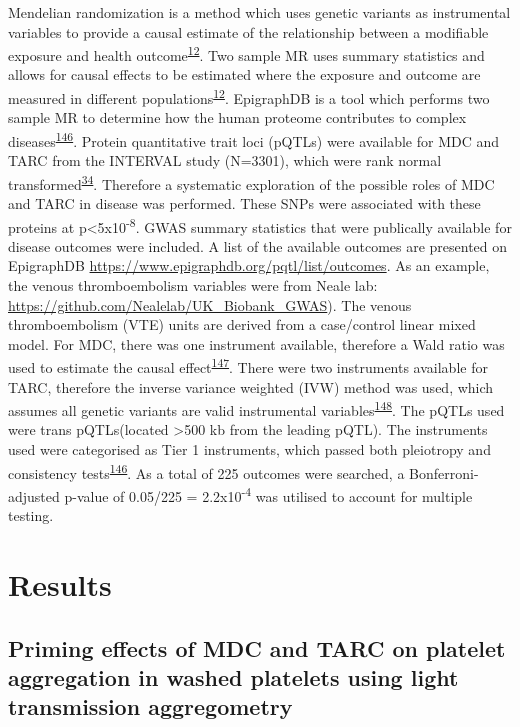 \documentclass[11pt,twoside]{bristolthesis}
\begin{document}
Mendelian randomization is a method which uses genetic variants as instrumental variables to provide a causal estimate of the relationship between a modifiable exposure and health outcome\textsuperscript{\protect\hyperlink{ref-Davies2018}{12}}. Two sample MR uses summary statistics and allows for causal effects to be estimated where the exposure and outcome are measured in different populations\textsuperscript{\protect\hyperlink{ref-Davies2018}{12}}. EpigraphDB is a tool which performs two sample MR to determine how the human proteome contributes to complex diseases\textsuperscript{\protect\hyperlink{ref-Zheng2020}{146}}. Protein quantitative trait loci (pQTLs) were available for MDC and TARC from the INTERVAL study (N=3301), which were rank normal transformed\textsuperscript{\protect\hyperlink{ref-Sun2018}{34}}. Therefore a systematic exploration of the possible roles of MDC and TARC in disease was performed. These SNPs were associated with these proteins at p\textless5x10\textsuperscript{-8}. GWAS summary statistics that were publically available for disease outcomes were included. A list of the available outcomes are presented on EpigraphDB \url{https://www.epigraphdb.org/pqtl/list/outcomes}. As an example, the venous thromboembolism variables were from Neale lab: \url{https://github.com/Nealelab/UK_Biobank_GWAS}). The venous thromboembolism (VTE) units are derived from a case/control linear mixed model. For MDC, there was one instrument available, therefore a Wald ratio was used to estimate the causal effect\textsuperscript{\protect\hyperlink{ref-Lawlor2008}{147}}. There were two instruments available for TARC, therefore the inverse variance weighted (IVW) method was used, which assumes all genetic variants are valid instrumental variables\textsuperscript{\protect\hyperlink{ref-Burgess2013}{148}}. The pQTLs used were trans pQTLs(located \textgreater500 kb from the leading pQTL). The instruments used were categorised as Tier 1 instruments, which passed both pleiotropy and consistency tests\textsuperscript{\protect\hyperlink{ref-Zheng2020}{146}}. As a total of 225 outcomes were searched, a Bonferroni-adjusted p-value of 0.05/225 = 2.2x10\textsuperscript{-4} was utilised to account for multiple testing.

\hypertarget{results-2}{%
\section{Results}\label{results-2}}

\hypertarget{priming-effects-of-mdc-and-tarc-on-platelet-aggregation-in-washed-platelets-using-light-transmission-aggregometry}{%
\subsection{Priming effects of MDC and TARC on platelet aggregation in washed platelets using light transmission aggregometry}\label{priming-effects-of-mdc-and-tarc-on-platelet-aggregation-in-washed-platelets-using-light-transmission-aggregometry}}
\end{document}
